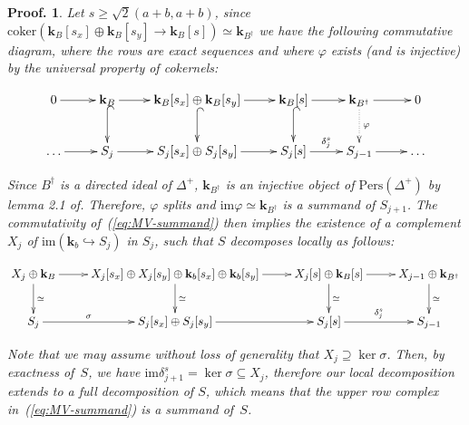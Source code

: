 \documentclass[a4paper, english, 11pt]{article}
\newcommand{\kk}[0]{\textbf{k}}
\newcommand{\Pe}{\text{Pers}}
\newcommand{\0}{\vec{0}}
\newtheorem*{pf}{Proof.} }
\begin{document}
\begin{pf}
Let $s \geq \sqrt{2}(a+b,a+b)$, since $\text{coker}\left (\kk_B[s_x] \oplus \kk_B[s_y] \longrightarrow \kk_B[s] \right ) \simeq \kk_{B^\dag} $  we have the following commutative diagram, where the rows are exact sequences and where $\varphi$ exists (and is injective) by the universal property of cokernels: 
 
 \begin{equation}\label{eq:MV-summand}
 \begin{gathered}
 \xymatrix{0 \ar[r] & \kk_B \ar@{^{(}->}[d] \ar[r] &\kk_B[s_x] \oplus \kk_B[s_y] \ar[r] \ar@{^{(}->}[d] & \kk_B[s]\ar[r] \ar@{^{(}->}[d] & \kk_{B^\dag} \ar[r] \ar@{.>}[d]^\varphi  & 0 \\
\dots \ar[r] & S_j \ar[r] & S_j[s_x] \oplus S_j[s_y] \ar[r] & S_j[s] \ar[r]^{\delta_j^s} & S_{j-1} \ar[r]& \dots  }
\end{gathered}
\end{equation}
 
Since $B^\dag$ is a directed ideal of $\Delta^+$, $\kk_{B^\dag}$ is an injective object of $\Pe(\Delta^+)$ by lemma 2.1 of\cite{BotCra18}. Therefore, $\varphi$ splits and $\text{im} \varphi \simeq \kk_{B^\dag}$ is a summand of $S_{j+1}$.  The commutativity of~(\ref{eq:MV-summand}) then implies the existence of a complement $X_j$ of $\text{im} (\kk_b\hookrightarrow S_j)$ in $S_j$, such that $S$ decomposes locally as follows:

$$
\xymatrix{X_j \oplus \kk_B \ar^-{\simeq}[d]\ar[r] &X_j[s_x] \oplus X_j[s_y] \oplus  \kk_b[s_x] \oplus \kk_b[s_y] \ar^-{\simeq}[d]\ar[r] & X_j[s] \oplus \kk_B[s] \ar^-{\simeq}[d] \ar[r]  & X_{j-1} \oplus \kk_{B^\dag} \ar^-{\simeq}[d]\\
S_j \ar^-{\sigma}[r] & S_j[s_x] \oplus S_j[s_y] \ar[r] & S_j[s] \ar[r]^{\delta_j^s} & S_{j-1}
}$$

Note that we may assume without loss of generality that $X_j \supseteq \ker \sigma$.
Then, by exactness of~$S$, we have $\text{im} \delta_{j+1}^s = \ker \sigma\subseteq X_j$, therefore our local decomposition extends to a full decomposition of $S$, which means that the upper row complex in~(\ref{eq:MV-summand}) is a summand of~$S$.
\end{pf}
\end{document}
